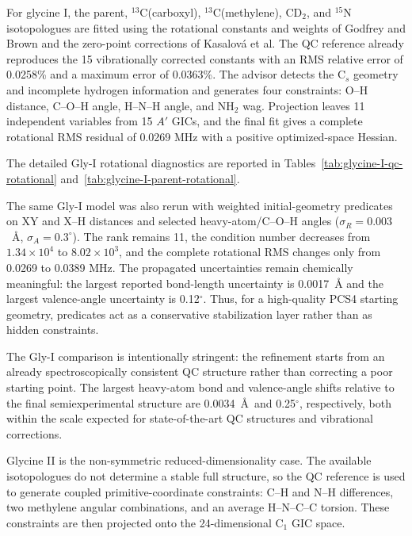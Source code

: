 \documentclass[aip,jcp,reprint,longbibliography,floatfix]{revtex4-2}
\begin{document}
For glycine I, the parent, $^{13}$C(carboxyl), $^{13}$C(methylene), CD$_2$,
and $^{15}$N isotopologues are fitted using the rotational constants and
weights of Godfrey and Brown\cite{GodfreyBrown1995ShapeGlycine} and the
zero-point corrections of Kasalov{\'a} et al.\cite{Kasalova2007Glycine} The
QC reference already reproduces the 15 vibrationally corrected constants
with an RMS relative error of 0.0258\% and a maximum error of 0.0363\%. The
advisor detects the C$_s$ geometry and incomplete hydrogen information and
generates four constraints: O--H distance, C--O--H angle, H--N--H angle, and
NH$_2$ wag. Projection leaves 11 independent variables from 15 $A'$ GICs, and
the final fit gives a complete rotational RMS residual of 0.0269 MHz with a
positive optimized-space Hessian.

The detailed Gly-I rotational diagnostics are reported in Tables~\ref{tab:glycine-I-qc-rotational} and~\ref{tab:glycine-I-parent-rotational}.


The same Gly-I model was also rerun with weighted initial-geometry predicates
on XY and X--H distances and selected heavy-atom/C--O--H angles
($\sigma_R=0.003$~\AA{}, $\sigma_A=0.3^\circ$). The rank remains 11, the
condition number decreases from $1.34\times10^4$ to $8.02\times10^3$, and the
complete rotational RMS changes only from 0.0269 to 0.0389 MHz. The propagated
uncertainties remain chemically meaningful: the largest reported bond-length
uncertainty is 0.0017~\AA{} and the largest valence-angle uncertainty is
0.12$^\circ$. Thus, for a high-quality PCS4 starting geometry, predicates act
as a conservative stabilization layer rather than as hidden constraints.

The Gly-I comparison is intentionally stringent: the refinement starts from an
already spectroscopically consistent QC structure rather than correcting a poor
starting point. The largest heavy-atom bond and valence-angle shifts relative
to the final semiexperimental structure are 0.0034~\AA\ and 0.25$^\circ$,
respectively, both within the scale expected for state-of-the-art QC structures
and vibrational corrections.\cite{PuzzariniStanton2023,Mendolicchio2025FastDvib}

Glycine II is the non-symmetric reduced-dimensionality case. The available
isotopologues do not determine a stable full structure, so the QC reference
is used to generate coupled primitive-coordinate constraints: C--H and N--H
differences, two methylene angular combinations, and an average H--N--C--C
torsion. These constraints are then projected onto the
24-dimensional C$_1$ GIC space.
\end{document}
